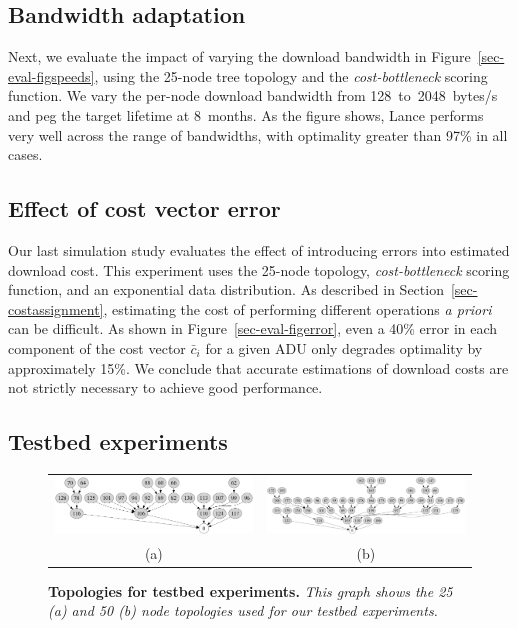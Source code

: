 \subsection{Bandwidth adaptation} 
\label{sec-eval-params}

Next, we evaluate the impact of varying the download bandwidth in
Figure~\ref{sec-eval-figspeeds}, using the 25-node tree topology and
the \emph{cost-bottleneck} scoring function. We vary the per-node download
bandwidth from 128~to~2048~bytes/s and peg the target lifetime at
8~months. As the figure shows, Lance performs very well
across the range of bandwidths, with optimality greater than
97\% in all cases.

\subsection{Effect of cost vector error}

Our last simulation study evaluates the effect of introducing errors into
estimated download cost. This experiment uses the 25-node topology,
\emph{cost-bottleneck} scoring function, and an exponential data
distribution.  As described in Section~\ref{sec-costassignment}, estimating
the cost of performing different operations {\em a priori} can be difficult.
As shown in Figure~\ref{sec-eval-figerror}, even a 40\% error in each
component of the cost vector $\bar{c}_i$ for a given ADU only degrades
optimality by approximately 15\%. We conclude that accurate estimations
of download costs are not strictly necessary to achieve good performance.


\subsection{Testbed experiments}
\label{sec-eval-policies}

\begin{figure}[t]
\begin{center}
\begin{tabular}{cc}
\includegraphics[width=0.45\hsize]{./figs/gwa/topologies/25.pdf} &
\includegraphics[width=0.45\hsize]{./figs/gwa/topologies/50.pdf} \\
(a) &
(b)\\
\end{tabular}
\end{center}
\caption{\small {\bf Topologies for testbed experiments.} 
{\em This graph shows the 25 (a) and 50 (b) node topologies used for our testbed
experiments.}}
\label{sec-eval-topologies}
\end{figure}

